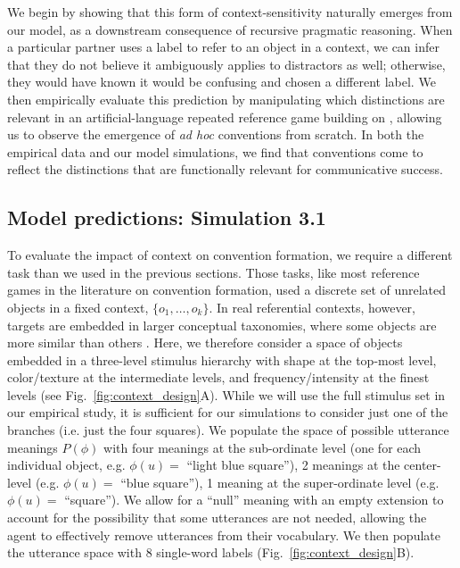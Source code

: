 We begin by showing that this form of context-sensitivity naturally emerges from our model, as a downstream consequence of recursive pragmatic reasoning.
When a particular partner uses a label to refer to an object in a context, we can infer that they do not believe it ambiguously applies to distractors as well; otherwise, they would have known it would be confusing and chosen a different label.
We then empirically evaluate this prediction by manipulating which distinctions are relevant in an artificial-language repeated reference game building on , allowing us to observe the emergence of \emph{ad hoc} conventions from scratch.
In both the empirical data and our model simulations, we find that conventions come to reflect the distinctions that are functionally relevant for communicative success. 

\subsection{Model predictions: Simulation 3.1}

To evaluate the impact of context on convention formation, we require a different task than we used in the previous sections.
Those tasks, like most reference games in the literature on convention formation, used a discrete set of unrelated objects in a fixed context, $\{o_1, \dots, o_k\}$. 
In real referential contexts, however, targets are embedded in larger conceptual taxonomies, where some objects are more similar than others \cite{bruner1956study,collins1969retrieval,XuTenenbaum07_WordLearningBayesian}.
Here, we therefore consider a space of objects embedded in a three-level stimulus hierarchy with shape at the top-most level, color/texture at the intermediate levels, and frequency/intensity at the finest levels (see Fig.~\ref{fig:context_design}A). 
While we will use the full stimulus set in our empirical study, it is sufficient for our simulations to consider just one of the branches (i.e. just the four squares).
We populate the space of possible utterance meanings $P(\phi)$ with four meanings at the sub-ordinate level (one for each individual object, e.g. $\phi(u) =$ ``light blue square''), 2 meanings at the center-level (e.g. $\phi(u) =$ ``blue square''), 1 meaning at the super-ordinate level (e.g. $\phi(u) =$ ``square''). 
We allow for a ``null'' meaning with an empty extension to account for the possibility that some utterances are not needed, allowing the agent to effectively remove utterances from their vocabulary. 
We then populate the utterance space with 8 single-word labels (Fig.~\ref{fig:context_design}B).

